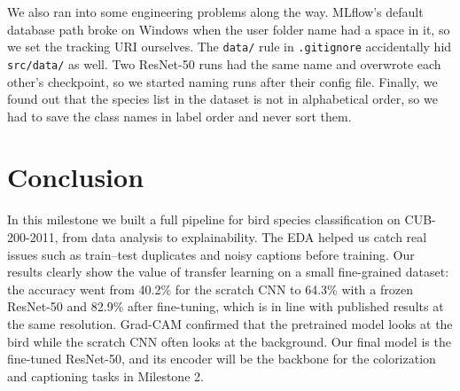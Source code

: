\documentclass[11pt,a4paper]{article}
\newcommand{\code}[1]{\texttt{\small #1}}
\begin{document}
We also ran into some engineering problems along the way. MLflow's default database path broke on Windows when the user folder name had a space in it, so we set the tracking URI ourselves. The \code{data/} rule in \code{.gitignore} accidentally hid \code{src/data/} as well. Two ResNet-50 runs had the same name and overwrote each other's checkpoint, so we started naming runs after their config file. Finally, we found out that the species list in the dataset is not in alphabetical order, so we had to save the class names in label order and never sort them.

\section{Conclusion}

In this milestone we built a full pipeline for bird species classification on CUB-200-2011, from data analysis to explainability. The EDA helped us catch real issues such as train--test duplicates and noisy captions before training. Our results clearly show the value of transfer learning on a small fine-grained dataset: the accuracy went from 40.2\% for the scratch CNN to 64.3\% with a frozen ResNet-50 and 82.9\% after fine-tuning, which is in line with published results at the same resolution. Grad-CAM confirmed that the pretrained model looks at the bird while the scratch CNN often looks at the background. Our final model is the fine-tuned ResNet-50, and its encoder will be the backbone for the colorization and captioning tasks in Milestone 2.
\end{document}
